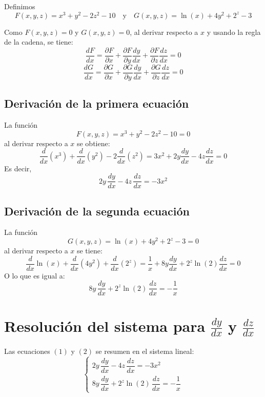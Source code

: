 \documentclass{article}
\begin{document}
Definimos
\[
F(x,y,z) = x^3+y^2-2z^2-10 \quad \text{y} \quad G(x,y,z)=\ln(x)+4y^2+2^z-3
\]

Como \( F(x,y,z)=0 \) y \( G(x,y,z)=0 \), al derivar respecto a \( x \) y usando la regla de la cadena, se tiene:
\begin{equation}
\frac{dF}{dx} = \frac{\partial F}{\partial x} + \frac{\partial F}{\partial y}\frac{dy}{dx} + \frac{\partial F}{\partial z}\frac{dz}{dx} = 0 \tag{1}
\end{equation}
\begin{equation}
\frac{dG}{dx} = \frac{\partial G}{\partial x} + \frac{\partial G}{\partial y}\frac{dy}{dx} + \frac{\partial G}{\partial z}\frac{dz}{dx} = 0 \tag{2}
\end{equation}

\subsection*{Derivación de la primera ecuación}
La función
\[
F(x,y,z)= x^3+y^2-2z^2-10=0
\]
al derivar respecto a \( x \) se obtiene:
\[
\frac{d}{dx}(x^3) + \frac{d}{dx}(y^2) -2\frac{d}{dx}(z^2)= 3x^2+2y\frac{dy}{dx}-4z\frac{dz}{dx}=0
\]
Es decir,
\begin{equation}
2y\,\frac{dy}{dx} - 4z\,\frac{dz}{dx} = -3x^2 \tag{1}
\end{equation}

\subsection*{Derivación de la segunda ecuación}
La función
\[
G(x,y,z)=\ln(x)+4y^2+2^z-3=0
\]
al derivar respecto a \( x \) se tiene:
\[
\frac{d}{dx}\ln(x)+ \frac{d}{dx}(4y^2)+\frac{d}{dx}(2^z)= \frac{1}{x}+8y\frac{dy}{dx}+2^z\ln(2)\frac{dz}{dx}=0
\]
O lo que es igual a:
\begin{equation}
8y\,\frac{dy}{dx} + 2^z\ln(2)\,\frac{dz}{dx} = -\frac{1}{x} \tag{2}
\end{equation}

\section*{Resolución del sistema para \(\frac{dy}{dx}\) y \(\frac{dz}{dx}\)}

Las ecuaciones \((1)\) y \((2)\) se resumen en el sistema lineal:
\[
\begin{cases}
2y\,\dfrac{dy}{dx} - 4z\,\dfrac{dz}{dx} = -3x^2 \\[1mm]
8y\,\dfrac{dy}{dx} + 2^z\ln(2)\,\dfrac{dz}{dx} = -\dfrac{1}{x}
\end{cases}
\]
\end{document}
